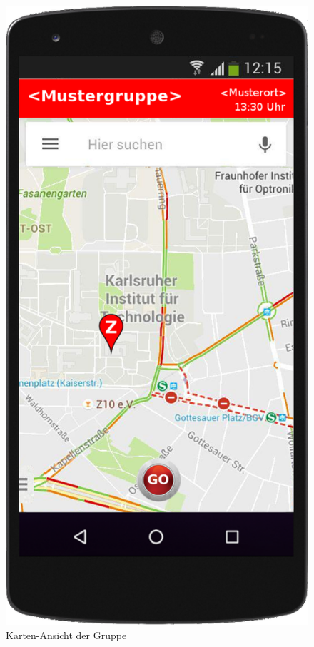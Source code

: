 \begin{figure}
	\caption{Karten-Ansicht der Gruppe}
	\includegraphics[scale =0.2]{resources/images/handy/map.png}
\end{figure}

